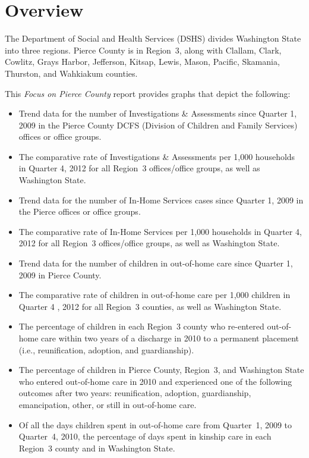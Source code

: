 \documentclass{article}\usepackage{graphicx, color}
\begin{document}
\vspace{-6pt}

\section*{Overview}

The Department of Social and Health Services (DSHS) divides Washington State into three regions. Pierce County is in Region~3, along with Clallam, Clark, Cowlitz, Grays Harbor, Jefferson, Kitsap, Lewis, Mason, Pacific, Skamania, Thurston, and Wahkiakum counties.

This \emph{Focus on Pierce County} report provides graphs that depict the following:

\begin{itemize}
  \item Trend data for the number of Investigations \& Assessments since Quarter 1, 2009 in the Pierce County DCFS (Division of Children and Family Services) offices or office groups.
  
  \item The comparative rate of Investigations \& Assessments per 1,000 households in Quarter 4, 2012 for all Region~3 offices/office groups, as well as Washington State.
 
  \item Trend data for the number of In-Home Services cases since Quarter 1, 2009 in the Pierce offices or office groups.
 
  \item The comparative rate of In-Home Services per 1,000 households in Quarter 4, 2012 for all Region~3 offices/office groups, as well as Washington State.
 
  \item Trend data for the number of children in out-of-home care since Quarter 1, 2009 in Pierce County. 
 
  \item The comparative rate of children in out-of-home care per 1,000 children in Quarter 4 , 2012 for all Region~3 counties, as well as Washington State.
 
  \item The percentage of children in each Region~3 county who re-entered out-of-home care within two years of a discharge in 2010 to a permanent placement (i.e., reunification, adoption, and guardianship).
 
  \item The percentage of children in Pierce County, Region~3, and Washington State who entered out-of-home care in 2010 and experienced one of the following outcomes after two years:  reunification, adoption, guardianship, emancipation, other, or still in out-of-home care.
 
   \item Of all the days children spent in out-of-home care from Quarter~1, 2009 to Quarter~4, 2010, the percentage of days spent in kinship care in each Region~3 county and in Washington State.
\end{itemize}
\end{document}
